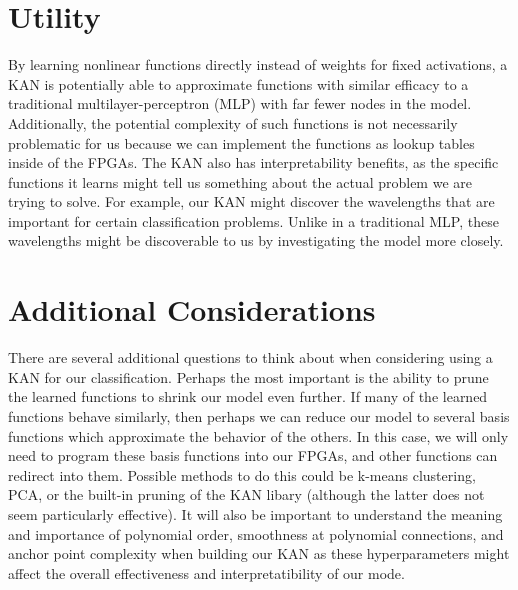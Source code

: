 \documentclass{article}
\begin{document}
\section{Utility}
By learning nonlinear functions directly instead of weights for fixed activations, a KAN is potentially able to approximate functions with similar efficacy to a traditional multilayer-perceptron (MLP) with far fewer nodes in the model. Additionally, the potential complexity of such functions is not necessarily problematic for us because we can implement the functions as lookup tables inside of the FPGAs. The KAN also has interpretability benefits, as the specific functions it learns might tell us something about the actual problem we are trying to solve. For example, our KAN might discover the wavelengths that are important for certain classification problems. Unlike in a traditional MLP, these wavelengths might be discoverable to us by investigating the model more closely.

\section{Additional Considerations}
There are several additional questions to think about when considering using a KAN for our classification. Perhaps the most important is the ability to prune the learned functions to shrink our model even further. If many of the learned functions behave similarly, then perhaps we can reduce our model to several basis functions which approximate the behavior of the others. In this case, we will only need to program these basis functions into our FPGAs, and other functions can redirect into them. Possible methods to do this could be k-means clustering, PCA, or the built-in pruning of the KAN libary (although the latter does not seem particularly effective). It will also be important to understand the meaning and importance of polynomial order, smoothness at polynomial connections, and anchor point complexity when building our KAN as these hyperparameters might affect the overall effectiveness and interpretatibility of our mode.
\end{document}
